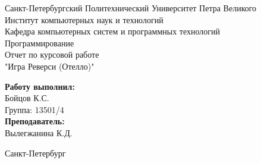 \documentclass[a4paper]{article}
\begin{document}

\begin{titlepage}	%

	\begin{center}		%

		\large Санкт-Петербургский Политехнический Университет Петра Великого\\
		\large Институт компьютерных наук и технологий \\
		\large Кафедра компьютерных систем и программных технологий\\[6cm]
		
		\huge Программирование\\[0.5cm] %
		\large Отчет по курсовой работе\\[0.1cm]
		\large "Игра Реверси (Отелло)"\\[5cm]

	\end{center}


	\begin{flushright} %
		\begin{minipage}{0.25\textwidth} %
			\begin{flushleft} %

				\large\textbf{Работу выполнил:}\\
				\large Бойцов К.С.\\
				\large {Группа:} 13501/4\\
				
				\large \textbf{Преподаватель:}\\
				\large Вылегжанина К.Д.
				

			\end{flushleft}
		\end{minipage}
	\end{flushright}
	
	\vfill %

	\begin{center}
	\large Санкт-Петербург\\
	\large \the\year %
	\end{center} %

\thispagestyle{empty} %
\end{titlepage} %
\end{document}
